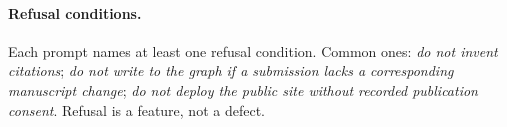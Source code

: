 \paragraph{Refusal conditions.}
Each prompt names at least one refusal condition. Common ones:
\emph{do not invent citations}; \emph{do not write to the graph if a
submission lacks a corresponding manuscript change}; \emph{do not
deploy the public site without recorded publication consent}. Refusal
is a feature, not a defect.

